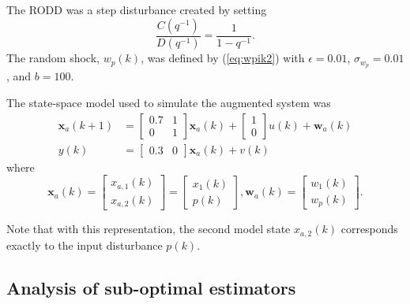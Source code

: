 The \gls{RODD} was a step disturbance created by setting
\begin{equation}
	\frac{C(q^{-1})}{D(q^{-1})} = \frac{1}{1-q^{-1}}.
\end{equation}
The random shock, $w_p(k)$, was defined by (\ref{eq:wpik2}) with $\epsilon=0.01$, $\sigma_{w_p}=0.01$, and $b=100$.

The state-space model used to simulate the augmented system was
\begin{equation} \label{eq:sim-sys-siso-ss-aug}
	\begin{split}
	\mathbf{x}_{a}(k+1) & =\left[\begin{array}{cc}
		0.7 & 1 \\
		0 & 1
	\end{array}\right] \mathbf{x}_{a}(k)+\left[\begin{array}{l}
		1 \\
		0
	\end{array}\right] u(k) + \mathbf{w}_{a}(k) \\
	y(k) & =\left[\begin{array}{cc}
	0.3 & 0
\end{array}\right] \mathbf{x}_{a}(k) + v(k)
\end{split}
\end{equation}
where
\begin{equation} \label{eq:sim-sys-siso-ss-aug2}
		\mathbf{x}_{a}(k) = \left[\begin{array}{l}
			x_{a,1}(k) \\
			x_{a,2}(k)
		\end{array}\right] = \left[\begin{array}{l}
		x_{1}(k) \\
		p(k)
	\end{array}\right], \mathbf{w}_{a}(k) = \left[\begin{array}{l}
	w_1(k) \\
	w_{p}(k)
\end{array}\right] .
\end{equation}

Note that with this representation, the second model state $x_{a,2}(k)$ corresponds exactly to the input disturbance $p(k)$.

\subsection{Analysis of sub-optimal estimators} \label{sim-obs-lin-1-SKF-analysis}

